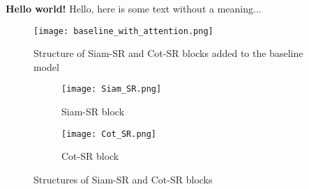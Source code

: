 \documentclass[../main.tex]{subfiles}
\begin{document}
\textbf{Hello world!}
Hello, here is some text without a meaning...\cite{shi2020graphaf}

\begin{figure}[h]
    \centering
    \texttt{[image: baseline\_with\_attention.png]}
    \caption{Structure of Siam-SR and Cot-SR blocks added to the baseline model}
    \label{fig:baseline_with_attention}
\end{figure}

\begin{figure}[h]
    \centering
    \begin{subfigure}[b]{0.21\linewidth}
        \texttt{[image: Siam\_SR.png]}
        \caption{Siam-SR block}
    \end{subfigure}
    \begin{subfigure}[b]{0.4\linewidth}
        \texttt{[image: Cot\_SR.png]}
        \caption{Cot-SR block}
    \end{subfigure}
    \caption{Structures of Siam-SR and Cot-SR blocks}
    \label{fig:attention_blocks}
\end{figure}
\end{document}
